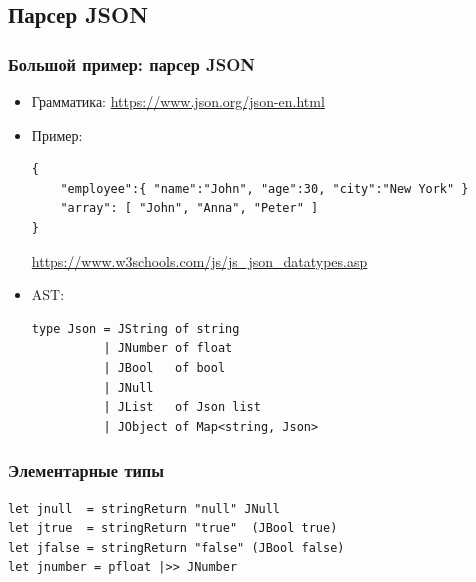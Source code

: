 \documentclass[xetex,mathserif,serif]{beamer}
\newcommand{\attribution}[1] {
	\begin{flushright}\begin{scriptsize}\textcolor{gray}{#1}\end{scriptsize}\end{flushright}
}
\begin{document}
	\subsection{Парсер JSON}

	\begin{frame}[fragile]
		\frametitle{Большой пример: парсер JSON}
		\begin{itemize}
			\item Грамматика: \url{https://www.json.org/json-en.html}
			\item Пример:
				\begin{verbatim}
{
    "employee":{ "name":"John", "age":30, "city":"New York" }
    "array": [ "John", "Anna", "Peter" ]
}
				\end{verbatim}
				\attribution{\url{https://www.w3schools.com/js/js_json_datatypes.asp}}
			\item AST:
				\begin{verbatim}
type Json = JString of string
          | JNumber of float
          | JBool   of bool
          | JNull
          | JList   of Json list
          | JObject of Map<string, Json>
				\end{verbatim}
		\end{itemize}
	\end{frame}

	\begin{frame}[fragile]
		\frametitle{Элементарные типы}
		\begin{verbatim}
let jnull  = stringReturn "null" JNull
let jtrue  = stringReturn "true"  (JBool true)
let jfalse = stringReturn "false" (JBool false)
let jnumber = pfloat |>> JNumber
		\end{verbatim}
	\end{frame}
\end{document}
